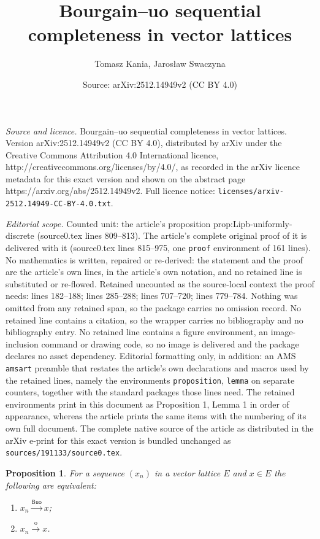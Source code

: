 \documentclass[10pt,a4paper]{amsart}
\title{Bourgain--uo sequential completeness in vector lattices}
\author{Tomasz Kania, Jaros{\l}aw Swaczyna}
\date{Source: arXiv:2512.14949v2 (CC BY 4.0)}
\newtheorem{proposition}{Proposition}
\newcommand{\Buo}{\ensuremath{\mathsf{Buo}}}
\begin{document}
\maketitle

\noindent\emph{Source and licence.} Bourgain--uo sequential completeness in vector lattices. Version arXiv:2512.14949v2 (CC BY 4.0), distributed by arXiv under the Creative Commons Attribution 4.0 International licence, http://creativecommons.org/licenses/by/4.0/, as recorded in the arXiv licence metadata for this exact version and shown on the abstract page https://arxiv.org/abs/2512.14949v2. Full licence notice: \texttt{licenses/arxiv-2512.14949-CC-BY-4.0.txt}.\par\smallskip

\noindent\textit{Editorial scope.} Counted unit: the article's proposition prop:Lipb-uniformly-discrete (source0.tex lines 809--813). The article's complete original proof of it is delivered with it (source0.tex lines 815--975, one \texttt{proof} environment of 161 lines). No mathematics is written, repaired or re-derived: the statement and the proof are the article's own lines, in the article's own notation, and no retained line is substituted or re-flowed.  Retained uncounted as the source-local context the proof needs: lines 182--188; lines 285--288; lines 707--720; lines 779--784.  Nothing was omitted from any retained span, so the package carries no omission record.  No retained line contains a citation, so the wrapper carries no bibliography and no bibliography entry.  No retained line contains a figure environment, an image-inclusion command or drawing code, so no image is delivered and the package declares no asset dependency.  Editorial formatting only, in addition: an AMS \texttt{amsart} preamble that restates the article's own declarations and macros used by the retained lines, namely the environments \texttt{proposition}, \texttt{lemma} on separate counters, together with the standard packages those lines need.  The retained environments print in this document as Proposition 1, Lemma 1 in order of appearance, whereas the article prints the same items with the numbering of its own full document.  The complete native source of the article as distributed in the arXiv e-print for this exact version is bundled unchanged as \texttt{sources/191133/source0.tex}.
\begin{proposition}\label{prop:Buo=order}
For a sequence $(x_n)$ in a vector lattice $E$ and $x\in E$ the following are equivalent:
\begin{enumerate}[label=(\roman*)]
\item $x_n\xrightarrow{\Buo} x$;
\item $x_n\xrightarrow{\mathrm{o}} x$.
\end{enumerate}
\end{proposition}
\end{document}
